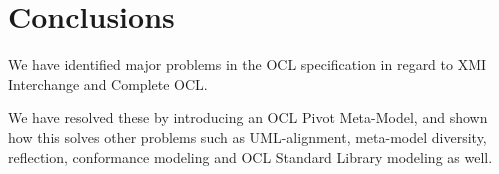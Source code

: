 \documentclass{eceasst}
\begin{document}

\section{Conclusions}

We have identified major problems in the OCL specification in regard to XMI Interchange and Complete OCL.

We have resolved these by introducing an OCL Pivot Meta-Model, and shown how this solves other problems such as UML-alignment, meta-model diversity, reflection, conformance modeling and OCL Standard Library modeling as well.




\nocite{*}


\end{document}
